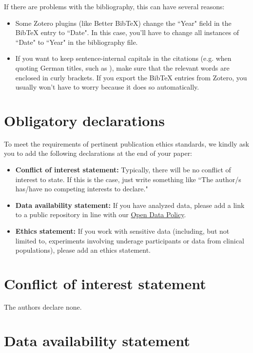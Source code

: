 If there are problems with the bibliography, this can have several reasons:

\begin{itemize}
    \item Some Zotero plugins (like Better BibTeX) change the ``Year" field in the BibTeX entry to ``Date". In this case, you'll have to change all instances of ``Date" to ``Year" in the bibliography file.
    \item If you want to keep sentence-internal capitals in the citations (e.g. when quoting German titles, such as \citeauthor{Example3} \citeyear{Example3}), make sure that the relevant words are enclosed in curly brackets. If you export the BibTeX entries from Zotero, you usually won't have to worry because it does so automatically.
\end{itemize}

\section*{Obligatory declarations}

To meet the requirements of pertinent publication ethics standards, we kindly ask you to add the following declarations at the end of your paper:

\begin{itemize}
    \item \textbf{Conflict of interest statement:} Typically, there will be no conflict of interest to state. If this is the case, just write something like ``The author/s has/have no competing interests to declare."
    \item \textbf{Data availability statement:} If you have analyzed data, please add a link to a public repository in line with our \href{https://constructions.journals.hhu.de/about}{Open Data Policy}. 
    \item \textbf{Ethics statement:} If you work with sensitive data (including, but not limited to, experiments involving underage participants or data from clinical populations), please add an ethics statement. 

    
\end{itemize}

\section*{Conflict of interest statement}

The authors declare none. %

\section*{Data availability statement}

